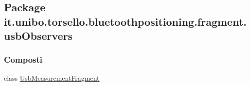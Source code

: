 \hypertarget{namespaceit_1_1unibo_1_1torsello_1_1bluetoothpositioning_1_1fragment_1_1usbObservers}{}\subsection{Package it.\+unibo.\+torsello.\+bluetoothpositioning.\+fragment.\+usb\+Observers}
\label{namespaceit_1_1unibo_1_1torsello_1_1bluetoothpositioning_1_1fragment_1_1usbObservers}
\subsubsection*{Composti}
\begin{DoxyCompactItemize}
\item 
class \hyperlink{classit_1_1unibo_1_1torsello_1_1bluetoothpositioning_1_1fragment_1_1usbObservers_1_1UsbMeasurementFragment}{Usb\+Measurement\+Fragment}
\end{DoxyCompactItemize}
